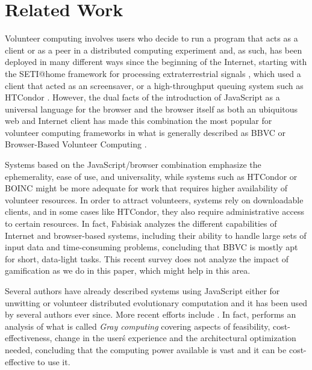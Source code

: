 \documentclass{llncs}
\begin{document}
\section{Related Work}
\label{sec:soa}

Volunteer computing involves users who decide to run a program that acts
as a client or as a peer in a distributed computing experiment
and, as such, has been deployed in many different ways since the
beginning of the Internet, starting with the SETI@home framework for
processing extraterrestrial signals \cite{david-seti:home}, which used
a client that acted as an screensaver, or a
high-throughput queuing system such as HTCondor \cite{HTCondor}.
However,
the dual facts of the introduction of JavaScript as a universal language for the
browser and the browser itself as both an ubiquitous web and Internet client has
made this combination the most popular for volunteer computing
frameworks in what is generally described as BBVC or Browser-Based
Volunteer Computing \cite{fabisiak2017browser}.

Systems based on the
JavaScript/browser combination
emphasize the ephemerality, ease of use, and universality, while
systems such as HTCondor or BOINC \cite{boinc_grid04} might be more adequate for work that 
requires higher availability of volunteer resources.
In order to attract volunteers, systems rely on downloadable clients, and in
some cases like HTCondor, they also require administrative access to
certain resources. In fact, Fabisiak \cite{fabisiak2017browser}
analyzes the different capabilities of Internet and browser-based
systems, including their ability to handle large sets of input data
and time-consuming problems, concluding that BBVC is mostly apt for
short, data-light tasks. This recent survey does not analyze the
impact of gamification as we do in this paper, which might help in
this area.

Several authors have already described systems using JavaScript either
for unwitting
\cite{unwitting-ec,boldrin2007distributed,apolonia2012enhancing} or volunteer
\cite{langdon:2005:metas,gecco07:workshop:dcor} distributed
evolutionary computation and it has been used by several
authors ever since. More recent efforts include
\cite{duda2013distributed,DBLP:journals/corr/abs-0801-1210,EvoStar2014:jsEO,martinez2015capataz,pan2015gray,desell2017large,rivas2017time,leclerc2016seamless,merelo2017performance}. In
fact, \cite{pan2015gray} performs an analysis of what
is called {\em Gray computing} covering aspects of 
feasibility, cost-effectiveness, change in the user\'s experience and the
architectural optimization needed, concluding that the computing power
available is vast and it can be cost-effective to use it.
\end{document}
